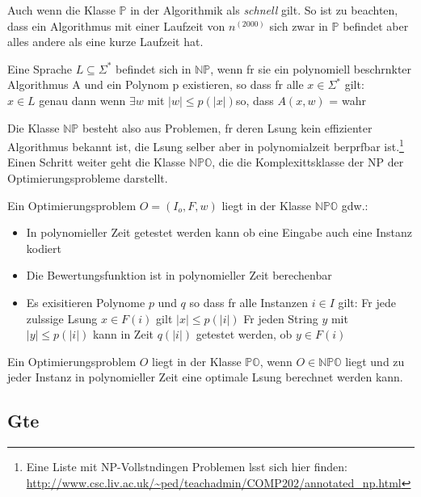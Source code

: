 \documentclass[12pt, a4paper, twoside]{scrartcl}
\begin{document}
Auch wenn die Klasse $\mathbb P$ in der Algorithmik als \emph{schnell} gilt. So ist zu beachten, dass ein Algorithmus mit einer Laufzeit von $n^{(2000)}$ sich zwar in $\mathbb P$ befindet aber alles andere als eine kurze Laufzeit hat.

\begin{definition}
	 Eine Sprache $L\subseteq \Sigma^*$ befindet sich in $\mathbb{NP}$, wenn fr sie ein polynomiell beschrnkter Algorithmus A und ein Polynom p existieren, so dass fr alle $x \in \Sigma^*$ gilt:\\
	$x\in L$ genau dann wenn $\exists w$ mit $|w|\leq p(|x|)$so, dass $A(x,w)$ = wahr
\end{definition}
Die Klasse $\mathbb{NP}$ besteht also aus Problemen, fr deren Lsung kein effizienter Algorithmus bekannt ist, die Lsung selber aber in polynomialzeit berprfbar ist.\footnote{
Eine Liste mit NP-Vollstndingen Problemen lsst sich hier finden: \url{http://www.csc.liv.ac.uk/~ped/teachadmin/COMP202/annotated_np.html}} Einen Schritt weiter geht die Klasse $\mathbb{NPO}$, die die Komplexittsklasse der NP der Optimierungsprobleme darstellt. 

\begin{definition}
	 Ein Optimierungsproblem $O = (I_{o},F,w)$ liegt in der Klasse $\mathbb{NPO}$ gdw.:
	\begin{itemize}
		\item In polynomieller Zeit getestet werden kann ob eine Eingabe auch eine Instanz kodiert
		\item Die Bewertungsfunktion ist in polynomieller Zeit berechenbar
		\item Es exisitieren Polynome $p$ und $q$ so dass fr alle Instanzen $i \in I$ gilt:
		\subitem Fr jede zulssige Lsung $x \in F(i)$ gilt $|x|\leq p(|i|)$
		\subitem Fr jeden String $y$ mit $|y| \leq p(|i|)$ kann in Zeit $q(|i|)$ getestet werden, ob $y \in F(i)$
	\end{itemize}
\end{definition}

\begin{definition}
	 Ein Optimierungsproblem $O$ liegt in der Klasse $\mathbb{PO}$, wenn $O \in \mathbb{NPO}$ liegt und zu jeder Instanz in polynomieller Zeit eine optimale Lsung berechnet werden kann.
\end{definition}


\subsection{Gte}%
\end{document}
